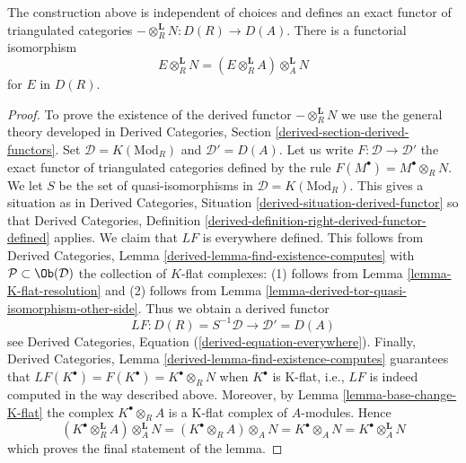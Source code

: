 \begin{lemma}
\label{lemma-derived-base-change}
The construction above is independent of choices and defines an exact
functor of triangulated categories $- \otimes_R^\mathbf{L} N : D(R) \to D(A)$.
There is a functorial isomorphism
$$
E \otimes_R^\mathbf{L} N = (E \otimes_R^\mathbf{L} A) \otimes_A^\mathbf{L} N
$$
for $E$ in $D(R)$.
\end{lemma}

\begin{proof}
To prove the existence of the derived functor $- \otimes_R^\mathbf{L} N$
we use the general theory developed in
Derived Categories, Section \ref{derived-section-derived-functors}.
Set $\mathcal{D} = K(\text{Mod}_R)$ and $\mathcal{D}' = D(A)$.
Let us write $F : \mathcal{D} \to \mathcal{D}'$ the exact functor
of triangulated categories defined by the rule
$F(M^\bullet) = M^\bullet \otimes_R N$. We let $S$ be the set of
quasi-isomorphisms in $\mathcal{D} = K(\text{Mod}_R)$.
This gives a situation as in
Derived Categories, Situation \ref{derived-situation-derived-functor}
so that
Derived Categories, Definition
\ref{derived-definition-right-derived-functor-defined}
applies. We claim that $LF$ is everywhere defined.
This follows from
Derived Categories, Lemma \ref{derived-lemma-find-existence-computes}
with $\mathcal{P} \subset \Ob(\mathcal{D})$ the collection
of $K$-flat complexes: (1) follows from
Lemma \ref{lemma-K-flat-resolution}
and (2) follows from
Lemma \ref{lemma-derived-tor-quasi-isomorphism-other-side}.
Thus we obtain a derived functor
$$
LF : D(R) = S^{-1}\mathcal{D} \longrightarrow \mathcal{D}' = D(A)
$$
see
Derived Categories, Equation (\ref{derived-equation-everywhere}).
Finally,
Derived Categories, Lemma \ref{derived-lemma-find-existence-computes}
guarantees that $LF(K^\bullet) = F(K^\bullet) = K^\bullet \otimes_R N$
when $K^\bullet$ is K-flat, i.e., $LF$ is indeed computed in the way
described above. Moreover, by Lemma \ref{lemma-base-change-K-flat}
the complex $K^\bullet \otimes_R A$ is a K-flat complex of $A$-modules.
Hence
$$
(K^\bullet \otimes_R^\mathbf{L} A) \otimes_A^\mathbf{L} N =
(K^\bullet \otimes_R A) \otimes_A N =
K^\bullet \otimes_A N =
K^\bullet \otimes_A^\mathbf{L} N
$$
which proves the final statement of the lemma.
\end{proof}

